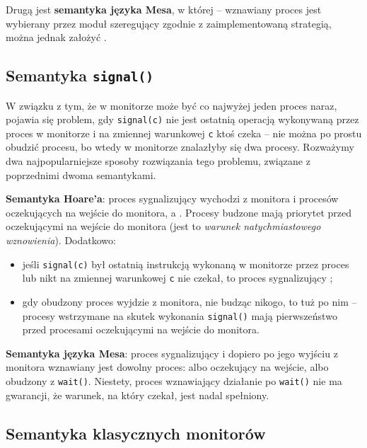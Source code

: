 Drugą jest \textbf{semantyka języka Mesa}, w której  -- wznawiany proces jest wybierany przez moduł szeregujący zgodnie z zaimplementowaną strategią, można jednak założyć .

\subsection{Semantyka \texttt{signal()}}

W związku z tym, że w monitorze może być co najwyżej jeden proces naraz, pojawia się problem, gdy \texttt{signal(c)} nie jest ostatnią operacją wykonywaną przez proces w monitorze i na zmiennej warunkowej \texttt{c} ktoś czeka -- nie można po prostu obudzić procesu, bo wtedy w monitorze znalazłyby się dwa procesy. Rozważymy dwa najpopularniejsze sposoby rozwiązania tego problemu, związane z poprzednimi dwoma semantykami.

\textbf{Semantyka Hoare'a}: proces sygnalizujący wychodzi z monitora i  procesów oczekujących na wejście do monitora, a . Procesy budzone mają priorytet przed oczekującymi na wejście do monitora (jest to \textit{warunek natychmiastowego wznowienia}). Dodatkowo:
\begin{itemize}
    \item jeśli \texttt{signal(c)} był ostatnią instrukcją wykonaną w monitorze przez proces lub nikt na zmiennej warunkowej \texttt{c} nie czekał, to proces sygnalizujący ;
    \item gdy obudzony proces wyjdzie z monitora, nie budząc nikogo, to tuż po nim  -- procesy wstrzymane na skutek wykonania \texttt{signal()} mają pierwszeństwo przed procesami oczekującymi na wejście do monitora.
\end{itemize}

\textbf{Semantyka języka Mesa}: proces sygnalizujący  i dopiero po jego wyjściu z monitora wznawiany jest dowolny proces: albo oczekujący na wejście, albo obudzony z \texttt{wait()}. Niestety, proces wznawiający działanie po \texttt{wait()} nie ma gwarancji, że warunek, na który czekał, jest nadal spełniony.

\subsection{Semantyka klasycznych monitorów}

